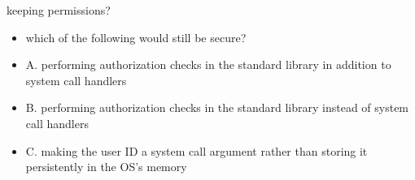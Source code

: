 \begin{frame}{keeping permissions?}
    \begin{itemize}
    \item which of the following would still be secure?
    \vspace{.5cm}
    \item A. performing authorization checks in the standard library in addition to system call handlers
    \item B. performing authorization checks in the standard library instead of system call handlers
    \item C. making the user ID a system call argument rather than storing it persistently in the OS's memory
    \end{itemize}
\end{frame}
